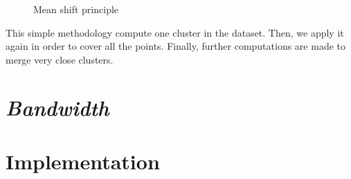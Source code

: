 \begin{figure}[h!]
{}
\caption{Mean shift principle\label{shif}}
\end{figure}

This simple methodology compute one cluster in the dataset. Then, we apply it again in order to cover all the points. Finally, further computations are made to merge very close clusters.

\section{\textit{Bandwidth}}


\section{Implementation}